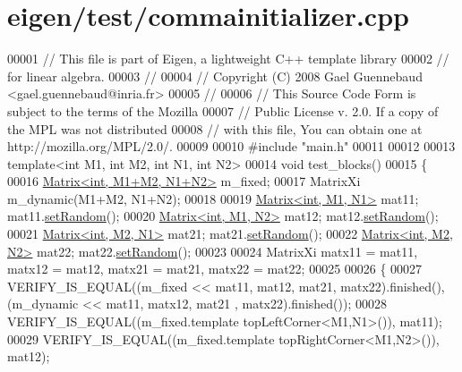 \hypertarget{eigen_2test_2commainitializer_8cpp_source}{}\section{eigen/test/commainitializer.cpp}
\label{eigen_2test_2commainitializer_8cpp_source}

\begin{DoxyCode}
00001 \textcolor{comment}{// This file is part of Eigen, a lightweight C++ template library}
00002 \textcolor{comment}{// for linear algebra.}
00003 \textcolor{comment}{//}
00004 \textcolor{comment}{// Copyright (C) 2008 Gael Guennebaud <gael.guennebaud@inria.fr>}
00005 \textcolor{comment}{//}
00006 \textcolor{comment}{// This Source Code Form is subject to the terms of the Mozilla}
00007 \textcolor{comment}{// Public License v. 2.0. If a copy of the MPL was not distributed}
00008 \textcolor{comment}{// with this file, You can obtain one at http://mozilla.org/MPL/2.0/.}
00009 
00010 \textcolor{preprocessor}{#include "main.h"}
00011 
00012 
00013 \textcolor{keyword}{template}<\textcolor{keywordtype}{int} M1, \textcolor{keywordtype}{int} M2, \textcolor{keywordtype}{int} N1, \textcolor{keywordtype}{int} N2>
00014 \textcolor{keywordtype}{void} test\_blocks()
00015 \{
00016   \hyperlink{group___core___module_class_eigen_1_1_matrix}{Matrix<int, M1+M2, N1+N2>} m\_fixed;
00017   MatrixXi m\_dynamic(M1+M2, N1+N2);
00018 
00019   \hyperlink{group___core___module_class_eigen_1_1_matrix}{Matrix<int, M1, N1>} mat11; mat11.\hyperlink{class_eigen_1_1_plain_object_base_af0e576a0e1aefc9ee346de44cc352ba3}{setRandom}();
00020   \hyperlink{group___core___module_class_eigen_1_1_matrix}{Matrix<int, M1, N2>} mat12; mat12.\hyperlink{class_eigen_1_1_plain_object_base_af0e576a0e1aefc9ee346de44cc352ba3}{setRandom}();
00021   \hyperlink{group___core___module_class_eigen_1_1_matrix}{Matrix<int, M2, N1>} mat21; mat21.\hyperlink{class_eigen_1_1_plain_object_base_af0e576a0e1aefc9ee346de44cc352ba3}{setRandom}();
00022   \hyperlink{group___core___module_class_eigen_1_1_matrix}{Matrix<int, M2, N2>} mat22; mat22.\hyperlink{class_eigen_1_1_plain_object_base_af0e576a0e1aefc9ee346de44cc352ba3}{setRandom}();
00023 
00024   MatrixXi matx11 = mat11, matx12 = mat12, matx21 = mat21, matx22 = mat22;
00025 
00026   \{
00027     VERIFY\_IS\_EQUAL((m\_fixed << mat11, mat12, mat21, matx22).finished(), (m\_dynamic << mat11, matx12, mat21
      , matx22).finished());
00028     VERIFY\_IS\_EQUAL((m\_fixed.template topLeftCorner<M1,N1>()), mat11);
00029     VERIFY\_IS\_EQUAL((m\_fixed.template topRightCorner<M1,N2>()), mat12);

\end{DoxyCode}
